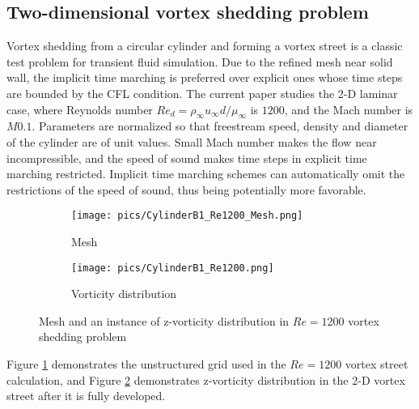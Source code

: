 \subsection{Two-dimensional vortex shedding problem}

Vortex shedding from a circular cylinder and forming a vortex street
is a classic test problem for transient fluid simulation. Due to the refined
mesh near solid wall, the implicit time marching is preferred
over explicit ones whose time steps are bounded by 
the CFL condition.
The current paper studies the 2-D laminar case, where
Reynolds number
$Re_d=\rho_\infty u_\infty d / \mu_\infty $ is  $1200$,
and the Mach number is $M0.1$.
Parameters are normalized so that freestream speed, density
and diameter of the cylinder are of unit values.
Small Mach number makes the flow near incompressible, and
the speed of sound makes time steps in explicit time marching
restricted.
Implicit time marching schemes can automatically omit the restrictions
of the speed of sound, thus being potentially more favorable.

\begin{figure}[htbp]
    \centering
    \begin{subfigure}{0.5\textwidth}
        \texttt{[image: pics/CylinderB1\_Re1200\_Mesh.png]}
        \caption[]{Mesh}
        \label{sfig:CylinderRe1200Demo_Mesh}
    \end{subfigure}\hfill
    \begin{subfigure}{0.5\textwidth}
        \texttt{[image: pics/CylinderB1\_Re1200.png]}
        \caption[]{Vorticity distribution}
        \label{sfig:CylinderRe1200Demo_Vort}
    \end{subfigure}
    \caption[]{Mesh and an instance of z-vorticity distribution
        in $Re=1200$ vortex shedding problem}
    \label{fig:CylinderRe1200Demo}
\end{figure}

Figure \ref{sfig:CylinderRe1200Demo_Mesh} demonstrates
the unstructured grid used in the $Re=1200$  vortex
street calculation, and Figure \ref{sfig:CylinderRe1200Demo_Vort}
demonstrates z-vorticity distribution in the 2-D vortex street
after it is fully developed.

